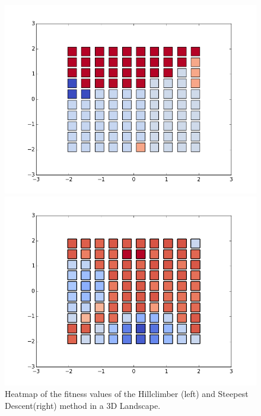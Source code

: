 \documentclass{scrartcl}
\begin{document}
\begin{figure}[H]
\centering
\begin{minipage}{.5\textwidth}
  \centering
  \includegraphics[width=.8\linewidth]{img/ex1/Heatmap_HC.png}
\end{minipage}%
\begin{minipage}{.5\textwidth}
  \centering
  \includegraphics[width=.8\linewidth]{img/ex1/Heatmap_SS.png}
\end{minipage}
\caption{Heatmap of the fitness values of the Hillclimber (left) and Steepest Descent(right) method in a 3D Landscape.}
\label{fig:}
\end{figure}
\end{document}
